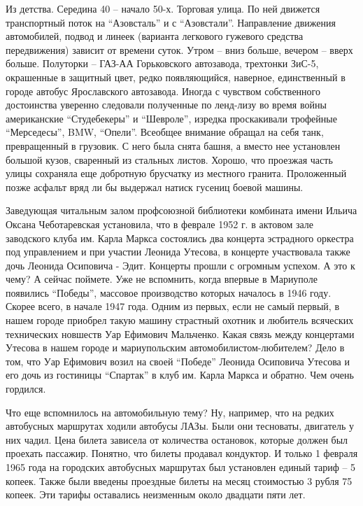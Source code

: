 Из детства. Середина 40 – начало 50-х. Торговая улица. По ней движется
транспортный поток на \enquote{Азовсталь} и с \enquote{Азовстали}. Направление движения
автомобилей, подвод и линеек (варианта легкового гужевого средства
передвижения) зависит от времени суток. Утром – вниз больше, вечером – вверх
больше. Полуторки – ГАЗ-АА Горьковского автозавода, трехтонки ЗиС-5, окрашенные
в защитный цвет, редко появляющийся, наверное, единственный в городе автобус
Ярославского автозавода. Иногда с чувством собственного достоинства уверенно
следовали полученные по ленд-лизу во время войны американские \enquote{Студебекеры} и
\enquote{Шевроле}, изредка проскакивали трофейные \enquote{Мерседесы}, BMW, \enquote{Опели}. Всеобщее
внимание обращал на себя танк, превращенный в грузовик. С него была снята
башня, а вместо нее установлен большой кузов, сваренный из стальных листов.
Хорошо, что проезжая часть улицы сохраняла еще добротную брусчатку из местного
гранита. Проложенный позже асфальт вряд ли бы выдержал натиск гусениц боевой
машины.

Заведующая читальным залом профсоюзной библиотеки комбината имени Ильича Оксана
Чеботаревская установила, что  в феврале 1952 г. в актовом зале заводского
клуба им. Карла Маркса состоялись два концерта эстрадного оркестра под
управлением и при участии Леонида Утесова, в концерте участвовала также дочь
Леонида Осиповича - Эдит. Концерты прошли с огромным успехом. А это к чему? А
сейчас поймете. Уже не вспомнить, когда впервые в Мариуполе появились \enquote{Победы},
массовое производство которых началось в 1946 году. Скорее всего, в начале 1947
года. Одним из первых, если не самый первый,  в нашем городе приобрел такую
машину страстный охотник и любитель всяческих технических новшеств Уар Ефимович
Мальченко. Какая связь между концертами Утесова в нашем городе и мариупольским
автомобилистом-любителем? Дело в том, что Уар Ефимович возил на своей \enquote{Победе}
Леонида Осиповича Утесова и его дочь из гостиницы \enquote{Спартак} в клуб им. Карла
Маркса и обратно. Чем очень гордился.

Что еще вспомнилось на автомобильную тему? Ну, например, что на редких
автобусных маршрутах ходили автобусы ЛАЗы. Были они тесноваты, двигатель у них
чадил. Цена билета зависела от количества остановок, которые должен был
проехать пассажир. Понятно, что билеты продавал кондуктор. И только 1 февраля
1965 года на городских автобусных маршрутах был установлен единый тариф – 5
копеек. Также были введены проездные билеты на месяц стоимостью 3 рубля 75
копеек. Эти тарифы оставались неизменным около двадцати пяти лет.
